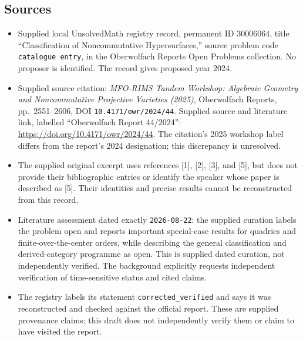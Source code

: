 \documentclass[11pt]{article}
\begin{document}
\subsection{Sources}
\begin{itemize}
\item Supplied local UnsolvedMath registry record, permanent ID \(30006064\), title ``Classification of Noncommutative Hypersurfaces,'' source problem code \texttt{catalogue entry}, in the Oberwolfach Reports Open Problems collection. No proposer is identified. The record gives proposed year 2024.
\item Supplied source citation: \emph{MFO-RIMS Tandem Workshop: Algebraic Geometry and Noncommutative Projective Varieties (2025)}, Oberwolfach Reports, pp.\ 2551--2606, DOI \texttt{10.4171/owr/2024/44}. Supplied source and literature link, labelled ``Oberwolfach Report 44/2024'': \url{https://doi.org/10.4171/owr/2024/44}. The citation's 2025 workshop label differs from the report's 2024 designation; this discrepancy is unresolved.
\item The supplied original excerpt uses references [1], [2], [3], and [5], but does not provide their bibliographic entries or identify the speaker whose paper is described as [5]. Their identities and precise results cannot be reconstructed from this record.
\item Literature assessment dated exactly \texttt{2026-08-22}: the supplied curation labels the problem open and reports important special-case results for quadrics and finite-over-the-center orders, while describing the general classification and derived-category programme as open. This is supplied dated curation, not independently verified. The background explicitly requests independent verification of time-sensitive status and cited claims.
\item The registry labels its statement \texttt{corrected\_verified} and says it was reconstructed and checked against the official report. These are supplied provenance claims; this draft does not independently verify them or claim to have visited the report.
\end{itemize}
\end{document}
